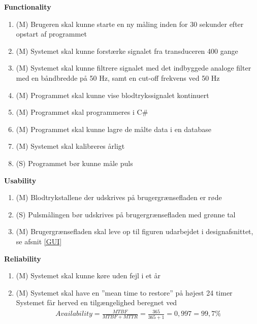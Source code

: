 \textbf{Functionality}\\
\begin{enumerate}
	\item (M) Brugeren skal kunne starte en ny måling inden for 30 sekunder efter opstart af programmet \\
	\item (M) Systemet skal kunne forstærke signalet fra transduceren 400 gange\\
	\item (M) Systemet skal kunne filtrere signalet med det indbyggede analoge filter med en båndbredde på 50 Hz, samt en cut-off frekvens ved 50 Hz \\
	\item (M) Programmet skal kunne vise blodtrykssignalet kontinuert\\
	\item (M) Programmet skal programmeres i C\#\\
	\item (M) Programmet skal kunne lagre de målte data i en database\\
	\item (M) Systemet skal kalibreres årligt\\
	\item (S) Programmet bør kunne måle puls\\
\end{enumerate}

\textbf{Usability}\\
\begin{enumerate}
	\item (M) Blodtrykstallene der udskrives på brugergrænsefladen er røde\\
	\item (S) Pulsmålingen bør udskrives på brugergrænsefladen med grønne tal\\
	\item (M) Brugergrænsefladen skal leve op til figuren udarbejdet i designafsnittet, se afsnit \ref{GUI} \\
\end{enumerate}

\textbf{Reliability}\\
\begin{enumerate}
	\item (M) Systemet skal kunne køre uden fejl i et år\\
	\item (M) Systemet skal have en ”mean time to restore” på højest 24 timer\\
	\subitem Systemet får herved en tilgængelighed beregnet ved \begin{align}
Availability = \frac{MTBF}{MTBF+MTTR} = \frac{365}{365+1} = 0,997 = 99,7 \%
\end{align}\\
\end{enumerate}

